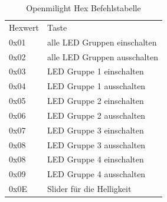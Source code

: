\begin{table}[h]
	\centering
	\begin{tabu} to \linewidth {l l}
		\toprule
		Hexwert & Taste \\
		0x01 & alle LED Gruppen einschalten \\
		0x02 & alle LED Gruppen ausschalten \\
		0x03 & LED Gruppe 1 einschalten \\
		0x04 & LED Gruppe 1 ausschalten \\
		0x05 & LED Gruppe 2 einschalten \\
		0x06 & LED Gruppe 2 ausschalten \\
		0x07 & LED Gruppe 3 einschalten \\
		0x08 & LED Gruppe 3 ausschalten \\
		0x08 & LED Gruppe 4 einschalten \\
		0x09 & LED Gruppe 4 ausschalten \\
		0x0E & Slider für die Helligkeit \\
		
		\bottomrule
	\end{tabu}
	\caption{Openmilight Hex Befehlstabelle}
\end{table}




